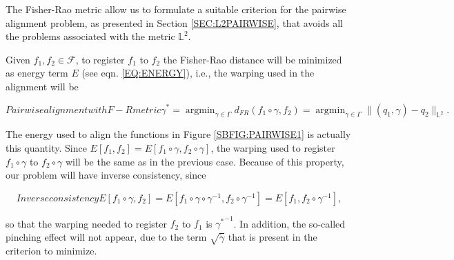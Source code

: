
The Fisher-Rao metric allow us to formulate a suitable criterion for the
pairwise alignment problem, as presented in Section \ref{SEC:L2PAIRWISE},
 that avoids all the problems associated with the metric $\mathbb{L}^2$.

Given $f_1, f_2 \in \mathscr{F}$, to register $f_1$ to $f_2$ the Fisher-Rao distance
will be minimized as energy term $E$ (see eqn. \ref{EQ:ENERGY}), i.e.,
the warping used in the alignment will be

\begin{equation}[EQ:DPAELASTIC]{Pairwise alignment with F-R metric}
\gamma^{*}= \operatorname{argmin}_{\gamma \in \Gamma} d_{FR}(f_1 \circ \gamma,
f_2) = \operatorname{argmin}_{\gamma \in \Gamma} \|
(q_1, \gamma) - q_2 \|_{\mathbb{L}^2}.
\end{equation}

The energy used to align the functions in Figure \ref{SBFIG:PAIRWISE1} is
actually this quantity.
Since
$E[f_1, f_2] = E[f_1 \circ \gamma, f_2 \circ \gamma]$, the warping used to
register $f_1 \circ \gamma$ to $f_2 \circ \gamma$ will be the same as in the
previous case.
Because of this property, our problem will have inverse consistency, since

\begin{equation}[]{Inverse consistency}
E[f_1 \circ \gamma, f_2] = E[f_1 \circ \gamma \circ \gamma^{-1}, f_2
\circ \gamma^{-1}] = E[f_1, f_2 \circ \gamma^{-1}],
\end{equation}

so that the warping needed to register $f_2$ to $f_1$  is ${\gamma^*}^{-1}$.
In addition, the so-called pinching effect will not appear, due to the term
$\sqrt{\dot \gamma}$ that is present in the criterion to minimize.


